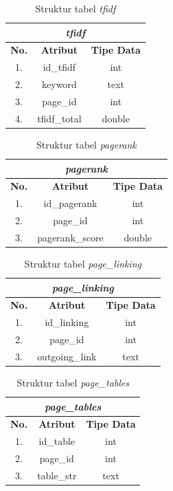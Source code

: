 \begin{table}[h!]
	\centering
	\caption{Struktur tabel \textit{tfidf}}
	\label{table:entity_tfidf}
	\begin{tabular}{|c|c|c|}
		\hline
		\multicolumn{3}{|c|}{\textit{tfidf}} \\
		\hline
		\textbf{No.} & \textbf{Atribut} & \textbf{Tipe Data} \\
		\hline
		1. & id\_tfidf & int \\
		2. & keyword & text \\
		3. & page\_id & int \\
		4. & tfidf\_total & double \\
		\hline
	\end{tabular}
\end{table}

\begin{table}[h!]
	\centering
	\caption{Struktur tabel \textit{pagerank}}
	\label{table:entity_pagerank}
	\begin{tabular}{|c|c|c|}
		\hline
		\multicolumn{3}{|c|}{\textit{pagerank}} \\
		\hline
		\textbf{No.} & \textbf{Atribut} & \textbf{Tipe Data} \\
		\hline
		1. & id\_pagerank & int \\
		2. & page\_id & int \\
		3. & pagerank\_score & double \\
		\hline
	\end{tabular}
\end{table}

\begin{table}[h!]
	\centering
	\caption{Struktur tabel \textit{page\_linking}}
	\label{table:entity_page_linking}
	\begin{tabular}{|c|c|c|}
		\hline
		\multicolumn{3}{|c|}{\textit{page\_linking}} \\
		\hline
		\textbf{No.} & \textbf{Atribut} & \textbf{Tipe Data} \\
		\hline
		1. & id\_linking & int \\
		2. & page\_id & int \\
		3. & outgoing\_link & text \\
		\hline
	\end{tabular}
\end{table}

\begin{table}[h!]
	\centering
	\caption{Struktur tabel \textit{page\_tables}}
	\label{table:entity_page_tables}
	\begin{tabular}{|c|c|c|}
		\hline
		\multicolumn{3}{|c|}{\textit{page\_tables}} \\
		\hline
		\textbf{No.} & \textbf{Atribut} & \textbf{Tipe Data} \\
		\hline
		1. & id\_table & int \\
		2. & page\_id & int \\
		3. & table\_str & text \\
		\hline
	\end{tabular}
\end{table}

